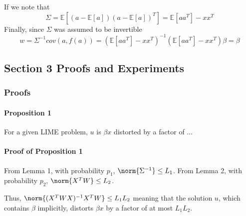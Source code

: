         If we note that 
        \begin{equation*}
            \Sigma = \mathds{E}[(a-\mathds{E}[a])(a-\mathds{E}[a])^T] = \mathds{E}[aa^T] - xx^T
        \end{equation*}
        Finally, since $\Sigma$ was assumed to be invertible 
        \begin{equation}
            w = \Sigma^{-1}cov(a,f(a)) = (\mathds{E}[aa^T] - xx^T)^{-1}(\mathds{E}[aa^T]-xx^T)\beta = \beta
        \end{equation}


\subsection{Section 3 Proofs and Experiments}
    \subsubsection{Proofs}

    \paragraph{Proposition 1} 
        For a given LIME problem, $u$ is $\beta x$ distorted by a factor of $\ldots$

    \paragraph{Proof of Proposition 1}
        From Lemma 1, with probability $p_1$, $\norm{\Sigma^{-1}} \leq L_1$.
        From Lemma 2, with probability $p_2$, $\norm{X^T W} \leq L_2$.

        Thus, $\norm{(X^T W X)^{-1} X^T W} \leq L_1 L_2$ meaning that the solution $u$, which contains $\beta$ implicitly, distorts $\beta x$ by a factor of at most $L_1 L_2$. 

